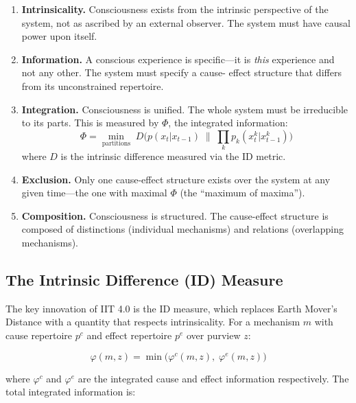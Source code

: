 \documentclass[12pt,a4paper]{article}
\begin{document}
\begin{enumerate}[leftmargin=2em]
  \item \textbf{Intrinsicality.} Consciousness exists from the intrinsic
    perspective of the system, not as ascribed by an external observer. The
    system must have causal power upon itself.

  \item \textbf{Information.} A conscious experience is specific---it is
    \emph{this} experience and not any other. The system must specify a cause-
    effect structure that differs from its unconstrained repertoire.

  \item \textbf{Integration.} Consciousness is unified. The whole system must
    be irreducible to its parts. This is measured by $\Phi$, the integrated
    information:
    \begin{equation}
    \Phi = \min_{\text{partitions}} \; D\bigl(p(x_t | x_{t-1}) \;\|\;
    \textstyle\prod_k p_k(x^k_t | x^k_{t-1})\bigr)
    \label{eq:phi_iit}
    \end{equation}
    where $D$ is the intrinsic difference measured via the ID metric.

  \item \textbf{Exclusion.} Only one cause-effect structure exists over the
    system at any given time---the one with maximal $\Phi$ (the
    ``maximum of maxima'').

  \item \textbf{Composition.} Consciousness is structured. The cause-effect
    structure is composed of distinctions (individual mechanisms) and
    relations (overlapping mechanisms).
\end{enumerate}

\subsection{The Intrinsic Difference (ID) Measure}

The key innovation of IIT 4.0 is the ID measure, which replaces Earth Mover's
Distance with a quantity that respects intrinsicality. For a mechanism $m$
with cause repertoire $p^c$ and effect repertoire $p^e$ over purview $z$:

\begin{equation}
\varphi(m, z) = \min\bigl(\varphi^c(m, z),\; \varphi^e(m, z)\bigr)
\end{equation}

\noindent
where $\varphi^c$ and $\varphi^e$ are the integrated cause and effect
information respectively. The total integrated information is:
\end{document}
